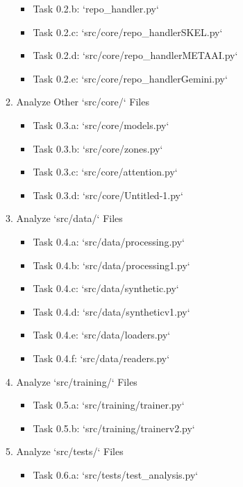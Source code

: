 \documentclass{article}
\begin{document}
\begin{enumerate}[label=\textbf{Phase \arabic*:}, wide, labelwidth=!, labelindent=0pt]
\begin{enumerate}[label=\textbf{Task 0.\arabic*:}, wide, labelwidth=!, labelindent=0pt, leftmargin=*]
\begin{itemize}
            \item[\textbullet] Task 0.2.b: `repo_handler.py`
            \item[\textbullet] Task 0.2.c: `src/core/repo_handlerSKEL.py`
            \item[\textbullet] Task 0.2.d: `src/core/repo_handlerMETAAI.py`
            \item[\textbullet] Task 0.2.e: `src/core/repo_handlerGemini.py`
        \end{itemize}
        \item Analyze Other `src/core/` Files
        \begin{itemize}
            \item[\textbullet] Task 0.3.a: `src/core/models.py`
            \item[\textbullet] Task 0.3.b: `src/core/zones.py`
            \item[\textbullet] Task 0.3.c: `src/core/attention.py`
            \item[\textbullet] Task 0.3.d: `src/core/Untitled-1.py`
        \end{itemize}
        \item Analyze `src/data/` Files
        \begin{itemize}
            \item[\textbullet] Task 0.4.a: `src/data/processing.py`
            \item[\textbullet] Task 0.4.b: `src/data/processing1.py`
            \item[\textbullet] Task 0.4.c: `src/data/synthetic.py`
            \item[\textbullet] Task 0.4.d: `src/data/syntheticv1.py`
            \item[\textbullet] Task 0.4.e: `src/data/loaders.py`
            \item[\textbullet] Task 0.4.f: `src/data/readers.py`
        \end{itemize}
        \item Analyze `src/training/` Files
        \begin{itemize}
            \item[\textbullet] Task 0.5.a: `src/training/trainer.py`
            \item[\textbullet] Task 0.5.b: `src/training/trainerv2.py`
        \end{itemize}
        \item Analyze `src/tests/` Files
        \begin{itemize}
            \item[\textbullet] Task 0.6.a: `src/tests/test_analysis.py`

\end{itemize}
\end{enumerate}
\end{enumerate}
\end{document}
